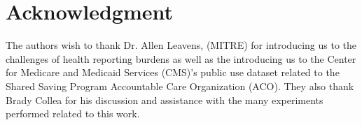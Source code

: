 \documentclass[conference]{IEEEtran}
\begin{document}

\section{Acknowledgment}
The authors wish to thank Dr. Allen Leavens, (MITRE) for introducing us to the challenges of health reporting burdens as well as the introducing us to the Center for Medicare and Medicaid Services (CMS)'s public use dataset related to the Shared Saving Program Accountable Care Organization (ACO).   They also thank Brady Collea for his discussion and  assistance with the many experiments performed related to this work.





\end{document}
